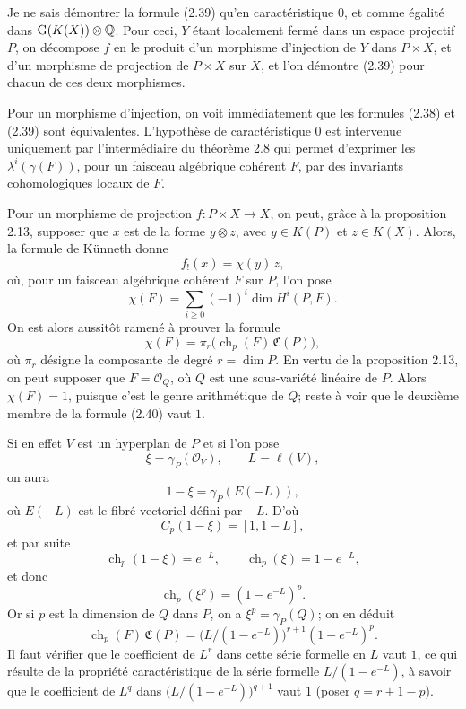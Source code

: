 \documentclass[11pt]{article}
\newcommand{\ch}{\operatorname{ch}}
\providecommand{\ch}{\operatorname{ch}}
\begin{document}
Je ne sais démontrer la formule (2.39) qu'en caractéristique \(0\), et comme égalité dans \(\mathrm{G}(K(X))\otimes\mathbb Q\). Pour ceci, \(Y\) étant localement fermé dans un espace projectif \(P\), on décompose \(f\) en le produit d'un morphisme d'injection de \(Y\) dans \(P\times X\), et d'un morphisme de projection de \(P\times X\) sur \(X\), et l'on démontre (2.39) pour chacun de ces deux morphismes.

Pour un morphisme d'injection, on voit immédiatement que les formules (2.38) et (2.39) sont équivalentes. L'hypothèse de caractéristique \(0\) est intervenue uniquement par l'intermédiaire du théorème 2.8 qui permet d'exprimer les \(\lambda^i(\gamma(F))\), pour un faisceau algébrique cohérent \(F\), par des invariants cohomologiques locaux de \(F\).

Pour un morphisme de projection \(f:P\times X\to X\), on peut, grâce à la proposition 2.13, supposer que \(x\) est de la forme \(y\otimes z\), avec \(y\in K(P)\) et \(z\in K(X)\). Alors, la formule de Künneth donne
\[
  f_!(x)=\chi(y)\,z,
\]
où, pour un faisceau algébrique cohérent \(F\) sur \(P\), l'on pose
\[
  \chi(F)=\sum_{i\geq 0}(-1)^i\dim H^i(P,F).
\]
On est alors aussitôt ramené à prouver la formule
\begin{equation}\tag{2.40}
  \chi(F)=\pi_r\bigl(\ch_p(F)\,\mathfrak C(P)\bigr),
\end{equation}
où \(\pi_r\) désigne la composante de degré \(r=\dim P\). En vertu de la proposition 2.13, on peut supposer que \(F=\mathcal O_Q\), où \(Q\) est une sous-variété linéaire de \(P\). Alors \(\chi(F)=1\), puisque c'est le genre arithmétique de \(Q\); reste à voir que le deuxième membre de la formule (2.40) vaut \(1\).

Si en effet \(V\) est un hyperplan de \(P\) et si l'on pose
\[
  \xi=\gamma_P(\mathcal O_V),\qquad L=\ell(V),
\]
on aura
\[
  1-\xi=\gamma_P(E(-L)),
\]
où \(E(-L)\) est le fibré vectoriel défini par \(-L\). D'où
\[
  C_p(1-\xi)=[1,1-L],
\]
et par suite
\[
  \ch_p(1-\xi)=e^{-L},\qquad \ch_p(\xi)=1-e^{-L},
\]
et donc
\[
  \ch_p(\xi^p)=(1-e^{-L})^p.
\]
Or si \(p\) est la dimension de \(Q\) dans \(P\), on a \(\xi^p=\gamma_P(Q)\); on en déduit
\[
  \ch_p(F)\,\mathfrak C(P)
  =
  \bigl(L/(1-e^{-L})\bigr)^{r+1}(1-e^{-L})^p.
\]
Il faut vérifier que le coefficient de \(L^r\) dans cette série formelle en \(L\) vaut \(1\), ce qui résulte de la propriété caractéristique de la série formelle \(L/(1-e^{-L})\), à savoir que le coefficient de \(L^q\) dans \(\bigl(L/(1-e^{-L})\bigr)^{q+1}\) vaut \(1\) (poser \(q=r+1-p\)).
\end{document}
